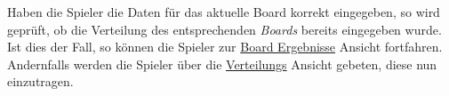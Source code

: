 \noindent
Haben die Spieler die Daten für das aktuelle Board korrekt eingegeben, so wird geprüft, ob die Verteilung des entsprechenden \textit{Boards} bereits eingegeben wurde.\\[.05cm]
Ist dies der Fall, so können die Spieler zur \hyperref[cli/boardres]{Board Ergebnisse} Ansicht fortfahren.\\[.05cm]
Andernfalls werden die Spieler über die \hyperref[cli/dist]{Verteilungs} Ansicht gebeten, diese nun einzutragen.
